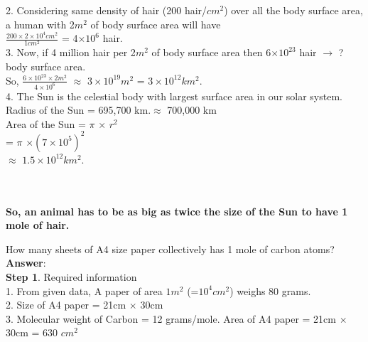 \documentclass[11pt]{exam}
\begin{document}
\begin{questions}
{\begin{minipage}{42em}
                          2. Considering same density of hair (200 hair/$cm^{2}$) over all the 
                             body surface area, a human with 2$m^{2}$ of body surface area 
                             will have \\
                      $\frac{200\times2\times10^{4}cm^{2}}{1cm^{2}}$ = 4$\times10^{6}$ hair.\\
                 
                          3. Now, if 4 million hair per 2$m^{2}$ of body surface area then 
                             6$\times10^{23}$ hair $\rightarrow$ ? body surface area.\\
                             So, $\frac{6\times10^{23}\times 2m^{2}}{4\times10^{6}}$ $\approx$ 
                             $3\times10^{19}m^{2}$ = $3\times10^{12} km^{2}$.\\ 
                  
                          4. The Sun is the celestial body with largest surface area in our 
                             solar system.\\ Radius of the Sun = 695,700 km.$\approx$ 700,000 
                             km \\
                             Area of the Sun = $\pi$ $\times$ $r^{2}$ \\
                                             = $\pi$ $\times(7\times10^{5})^{2}$   \\
                                             $\approx$ $1.5\times10^{12}km^{2}$. 
\end{minipage}}\\  \\
         \textbf{So, an animal has to be as big as twice the size of the Sun to have 1 mole of hair.} \\                  


\question
\label{Q4:A4 paper}

How many sheets of A4 size paper collectively has 1 mole of carbon atoms?\\
\textbf{Answer}: \\ 
\textbf{Step 1}. Required information\\ 
1. From given data, A paper of area $1m^{2}$ (=$10^{4}cm^{2}$) weighs 80 grams. \\ 
2. Size of A4 paper = 21cm $\times$ 30cm \\ 
3. Molecular weight of Carbon = 12 grams/mole.
 Area of A4 paper = 21cm $\times$ 30cm = 630 $cm^{2}$\\ 


\end{questions}
\end{document}
